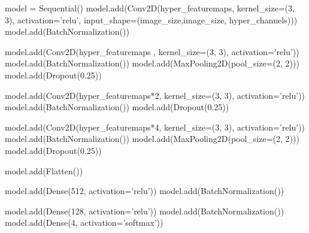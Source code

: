 \begin{enumerate}
\begin{itemize}
\end{itemize}
\newpage

    \begin{python}
model = Sequential()
model.add(Conv2D(hyper_featuremaps, kernel_size=(3, 3), activation='relu', input_shape=(image_size,image_size, hyper_channels)))
model.add(BatchNormalization())

model.add(Conv2D(hyper_featuremaps , kernel_size=(3, 3), activation='relu'))
model.add(BatchNormalization())
model.add(MaxPooling2D(pool_size=(2, 2)))
model.add(Dropout(0.25))

model.add(Conv2D(hyper_featuremaps*2, kernel_size=(3, 3), activation='relu'))
model.add(BatchNormalization())
model.add(Dropout(0.25))

model.add(Conv2D(hyper_featuremaps*4, kernel_size=(3, 3), activation='relu'))
model.add(BatchNormalization())
model.add(MaxPooling2D(pool_size=(2, 2)))
model.add(Dropout(0.25))

model.add(Flatten())

model.add(Dense(512, activation='relu'))
model.add(BatchNormalization())

model.add(Dense(128, activation='relu'))
model.add(BatchNormalization())
model.add(Dense(4, activation='softmax'))


\end{python}
\end{enumerate}
